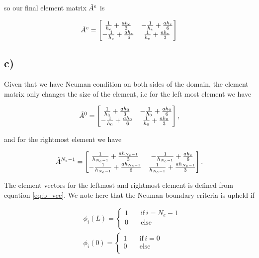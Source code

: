\documentclass[norsk,a4paper,12pt]{scrartcl}
\begin{document}
so our final element matrix $\Tilde{A}^e$ is

\begin{equation}\label{eq:A_e}
    \Tilde{A}^e = 
    \begin{bmatrix}
    \frac{1}{h_e} + \frac{ah_e}{3} & -\frac{1}{h_e} + \frac{ah_e}{6} \\
     -\frac{1}{h_e} + \frac{ah_e}{6} & \frac{1}{h_e} + \frac{ah_e}{3}
    \end{bmatrix}
\end{equation}

\subsection{c)}

Given that we have Neuman condition on both sides of the domain, the element matrix only changes the size of the element, i.e for the left most element we have 

\begin{equation}
    \Tilde{A}^0 = 
    \begin{bmatrix}
    \frac{1}{h_0} + \frac{ah_0}{3} & -\frac{1}{h_0} + \frac{ah_0}{6} \\
     -\frac{1}{h_0} + \frac{ah_0}{6} & \frac{1}{h_0} + \frac{ah_0}{3}
    \end{bmatrix},
\end{equation}

and for the rightmost element we have 

\begin{equation}
    \Tilde{A}^{N_e-1} = 
    \begin{bmatrix}
    \frac{1}{h_{N_e-1}} + \frac{ah_{N_e-1}}{3} & -\frac{1}{h_{N_e-1}} + \frac{ah_e}{6} \\
     -\frac{1}{h_{N_e-1}} + \frac{ah_{N_e-1}}{6} & \frac{1}{h_{N_e-1}} + \frac{ah_{N_e-1}}{3}
    \end{bmatrix}.
\end{equation}

The element vectors for the leftmost and rightmost element is defined from equation \ref{eq:b_vec}. We note here that the Neuman boundary criteria is upheld if 

\begin{equation*}
\begin{aligned}
     &\phi_{i}(L) = \begin{cases}
          1 \quad &\text{if} \, i = N_e-1 \\
          0 \quad &\text{else} \\
     \end{cases}\\
    &\phi_{i}(0) = \begin{cases}
          1 \quad &\text{if} \, i = 0 \\
          0 \quad &\text{else} \\
     \end{cases}
\end{aligned}
\end{equation*}
\end{document}
